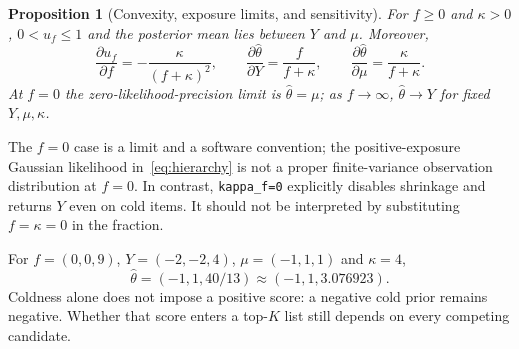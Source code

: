 \documentclass[11pt,a4paper]{article}
\newtheorem{proposition}[theorem]{Proposition}
\theoremstyle{remark}
\newcommand{\code}[1]{\texttt{\small #1}}
\begin{document}
\begin{proposition}[Convexity, exposure limits, and sensitivity]
For $f\geq0$ and $\kappa>0$, $0<u_f\leq1$ and the posterior mean lies
between $Y$ and $\mu$. Moreover,
\begin{equation}
 \frac{\partial u_f}{\partial f}=-\frac\kappa{(f+\kappa)^2},\qquad
 \frac{\partial\widehat\theta}{\partial Y}=\frac f{f+\kappa},\qquad
 \frac{\partial\widehat\theta}{\partial\mu}=\frac\kappa{f+\kappa}.
\end{equation}
At $f=0$ the zero-likelihood-precision limit is $\widehat\theta=\mu$;
as $f\to\infty$, $\widehat\theta\to Y$ for fixed $Y,\mu,\kappa$.
\end{proposition}
The $f=0$ case is a limit and a software convention; the positive-exposure
Gaussian likelihood in~\eqref{eq:hierarchy} is not a proper finite-variance
observation distribution at $f=0$. In contrast, \code{kappa\_f=0}
explicitly disables shrinkage and returns $Y$ even on cold items. It
should not be interpreted by substituting $f=\kappa=0$ in the fraction.

For $f=(0,0,9)$, $Y=(-2,-2,4)$, $\mu=(-1,1,1)$ and $\kappa=4$,
\begin{equation}
 \widehat\theta=(-1,1,40/13)\approx(-1,1,3.076923).
\end{equation}
Coldness alone does not impose a positive score: a negative cold prior
remains negative. Whether that score enters a top-$K$ list still depends
on every competing candidate.
\end{document}
